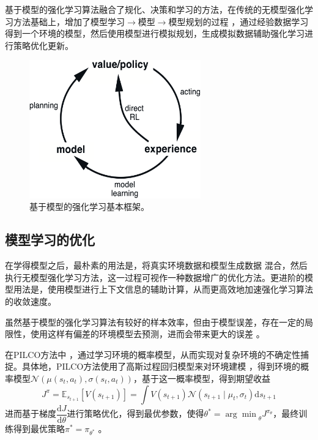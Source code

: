 基于模型的强化学习算法融合了规化、决策和学习的方法，在传统的无模型强化学习方法基础上，增加了模型学习$\longrightarrow$模型$\longrightarrow$模型规划的过程 \cite{lin1992self}，通过经验数据学习得到一个环境的模型，然后使用模型进行模拟规划，生成模拟数据辅助强化学习进行策略优化更新。

\begin{figure}[tbh]
\centering
\includegraphics[width=0.66\textwidth]{figures/Dyna.png}
\caption{基于模型的强化学习基本框架。}
\label{fig:dyna-structure}
\end{figure}

\subsection{模型学习的优化}

在学得模型之后，最朴素的用法是，将真实环境数据和模型生成数据 混合，然后执行无模型强化学习方法，这一过程可视作一种数据增广的优化方法。更进阶的模型用法是，使用模型进行上下文信息的辅助计算，从而更高效地加速强化学习算法的收敛速度。

虽然基于模型的强化学习算法有较好的样本效率，但由于模型误差，存在一定的局限性，使用这样有偏差的环境模型去预测，进而会带来更大的误差 \cite{zambaldi2018deep}。

在PILCO方法中 \cite{deisenroth2011pilco}，通过学习环境的概率模型，从而实现对复杂环境的不确定性捕捉。具体地，PILCO方法使用了高斯过程回归模型来对环境建模 \cite{quinonero2005unifying}，得到环境的概率模型$\mathcal{N}\left(\mu(s_t,a_t), \sigma(s_t,a_t)\right)$，基于这一概率模型，得到期望收益
\begin{equation}
    J^\pi=\mathbb{E}_{s_{t+1}}\left[V\left(s_{t+1}\right)\right]=\int V\left(s_{t+1}\right) \mathcal{N}\left(s_{t+1} \mid \mu_t, \sigma_t\right) \mathrm{d} s_{t+1}
\end{equation}
进而基于梯度$\dfrac{\mathrm{d}J}{\mathrm{d}\theta}$进行策略优化，得到最优参数，使得$\theta^* = {\arg\min}_\theta J^{\pi_\theta}$，最终训练得到最优策略$\pi^*=\pi_{\theta^*}$ 。\cite{peters2006policy}

